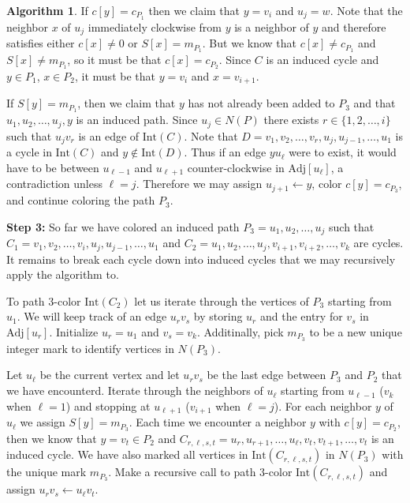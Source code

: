 \documentclass[12pt,letterpaper]{article}
\theoremstyle{plain}
\theoremstyle{definition}
\theoremstyle{break}
\newtheorem{algorithm}[lemma]{Algorithm}     %
\begin{document}
\begin{algorithm}
If $c[y]=c_{P_1}$ then we claim that $y=v_i$ and $u_j=w$. Note that the
neighbor $x$ of $u_j$ immediately clockwise from $y$ is a neighbor of $y$
and therefore satisfies either $c[x]\ne 0$ or $S[x]=m_{P_1}$. But we know
that $c[x]\ne c_{P_1}$ and $S[x]\ne m_{P_1}$, so it must be that
$c[x]=c_{P_2}$. Since $C$ is an induced cycle and $y\in P_1$, $x\in P_2$, it
must be that $y=v_i$ and $x=v_{i+1}$.

If $S[y]=m_{P_1}$, then we claim that $y$ has not already been added to
$P_3$ and that $u_1,u_2,\ldots,u_j,y$ is an induced
path. Since $u_j\in N(P)$ there exists $r\in\{1,2,\ldots,i\}$ such that
$u_jv_r$ is an edge of $\text{Int}(C)$. Note that
$D=v_1,v_2,\ldots,v_r,u_j,u_{j-1},\ldots,u_1$ is a cycle in $\text{Int}(C)$
and $y\not\in\text{Int}(D)$.
Thus if an edge $yu_\ell$ were to exist, it would have to
be between $u_{\ell-1}$ and $u_{\ell+1}$ counter-clockwise in
$\text{Adj}[u_\ell]$, a contradiction
unless $\ell=j$. Therefore we may assign $u_{j+1}\leftarrow y$, color
$c[y]=c_{P_3}$, and continue coloring the path $P_3$.

\textbf{Step 3:} So far we have colored an induced path
$P_3=u_1,u_2,\ldots,u_j$ such that
$C_1=v_1,v_2,\ldots,v_i,u_j,u_{j-1},\ldots,u_1$ and
$C_2=u_1,u_2,\ldots,u_j,v_{i+1},v_{i+2},\ldots,v_k$ are cycles. It remains
to break each cycle down into induced cycles that we may recursively
apply the algorithm to.

To path $3$-color $\text{Int}(C_2)$ let us iterate through the vertices of
$P_3$ starting from $u_1$.
We will keep track of an edge $u_rv_s$ by storing $u_r$ and the entry
for $v_s$ in
$\text{Adj}[u_r]$. Initialize $u_r = u_1$ and $v_s=v_k$. Additinally,
pick $m_{P_3}$ to be a new unique integer mark to identify vertices in
$N(P_3)$.

Let $u_\ell$ be the current vertex and let $u_rv_s$ be the last edge
between $P_3$ and $P_2$ that we have encounterd. Iterate through the neighbors of $u_\ell$
starting from $u_{\ell-1}$ ($v_k$ when $\ell=1$) and stopping at $u_{\ell+1}$
($v_{i+1}$ when $\ell=j$). For each neighbor $y$ of $u_\ell$ we assign
$S[y]=m_{P_3}$. Each time we encounter a neighbor $y$ with
$c[y]=c_{P_2}$, then we know that $y=v_t\in P_2$ and
$C_{r,\ell,s,t}=u_r,u_{r+1},\ldots,u_\ell,v_t,v_{t+1},\ldots,v_t$ is an induced cycle. We
have also marked all vertices in $\text{Int}(C_{r,\ell,s,t})$ in $N(P_3)$
with the unique mark $m_{P_3}$. Make a recursive call to path $3$-color
$\text{Int}(C_{r,\ell,s,t})$ and assign $u_rv_s\leftarrow u_\ell v_t$.


\end{algorithm}
\end{document}
